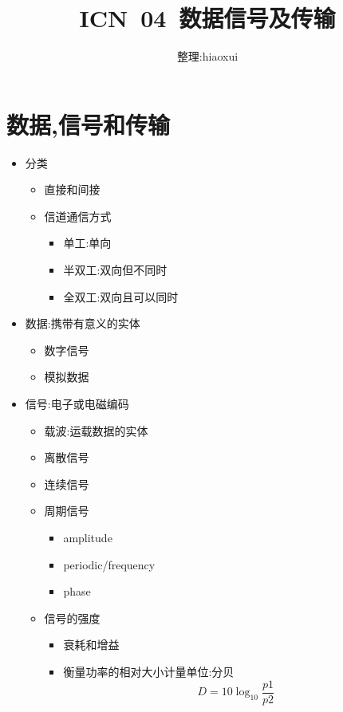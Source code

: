 \documentclass[a4paper,12pt,notitlepage]{article}
\begin{document}
\title{ICN\ 04\ 数据信号及传输}
\author{整理:hiaoxui}
\maketitle

\section{数据,信号和传输}

\begin{itemize}
	\item 分类
	\begin{itemize}
		\item 直接和间接
		\item 信道通信方式
		\begin{itemize}
			\item 单工:单向
			\item 半双工:双向但不同时
			\item 全双工:双向且可以同时
		\end{itemize}
	\end{itemize}
	\item 数据:携带有意义的实体
	\begin{itemize}
		\item 数字信号
		\item 模拟数据
	\end{itemize}
	\item 信号:电子或电磁编码
	\begin{itemize}
		\item 载波:运载数据的实体
		\item 离散信号
		\item 连续信号
		\item 周期信号
		\begin{itemize}
			\item amplitude
			\item periodic/frequency
			\item phase
		\end{itemize}
		\item 信号的强度
		\begin{itemize}
			\item 衰耗和增益
			\item 衡量功率的相对大小计量单位:分贝
			\begin{equation}
				D = 10 \log_{10}\frac{p1}{p2}
			\end{equation}
		\end{itemize}
	\end{itemize}

\end{itemize}
\end{document}
